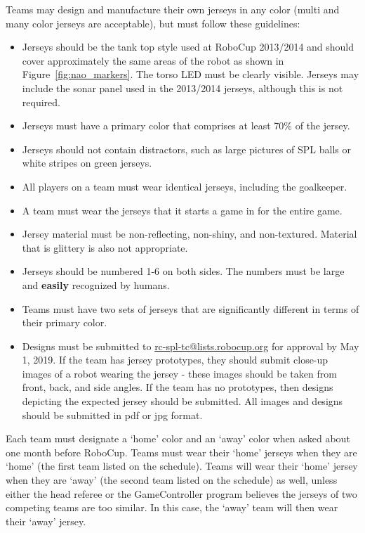 \documentclass[12pt]{article}
\begin{document}
Teams may design and manufacture their own jerseys in any color (multi and many color jerseys are acceptable), but must follow these guidelines:
\begin{itemize}
\item Jerseys should be the tank top style used at RoboCup 2013/2014 and should cover approximately the same areas of the robot as shown in Figure~\ref{fig:nao_markers}.  The torso LED must be clearly visible.  Jerseys may include the sonar panel used in the 2013/2014 jerseys, although this is not required.
\item Jerseys must have a primary color that comprises at least 70\% of the jersey.
\item Jerseys should not contain distractors, such as large pictures of SPL balls or white stripes on green jerseys.
\item All players on a team must wear identical jerseys, including the goalkeeper.
\item A team must wear the jerseys that it starts a game in for the entire game.
\item Jersey material must be non-reflecting, non-shiny, and non-textured.  Material that is glittery is also not appropriate.
\item Jerseys should be numbered 1-6 on both sides.  The numbers must be large and {\bf easily} recognized by humans.
\item Teams must have two sets of jerseys that are significantly different in terms of their primary color.
\item Designs must be submitted to \url{rc-spl-tc@lists.robocup.org} for approval by May 1, 2019. If the team has jersey prototypes, they should submit close-up images of a robot wearing the jersey - these images should be taken from front, back, and side angles.  If the team has no prototypes, then designs depicting the expected jersey should be submitted.  All images and designs should be submitted in pdf or jpg format.
\end{itemize}

Each team must designate a `home' color and an `away' color when asked about one month before RoboCup.  Teams must wear their `home' jerseys when they are `home' (the first team listed on the schedule).  Teams will wear their `home' jersey when they are `away' (the second team listed on the schedule) as well, unless either the head referee or the GameController program believes the jerseys of two competing teams are too similar.  In this case, the `away' team will then wear their `away' jersey.
\end{document}
